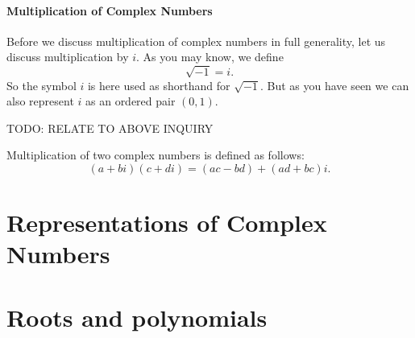 \documentclass[11pt]{article}
\theoremstyle{definition}
\begin{document}
\subsection{Multiplication of Complex Numbers}

Before we discuss multiplication of complex numbers in full generality, let us discuss multiplication by $i$. As you may know, we define
\[ \sqrt{-1} = i. \]
So the symbol $i$ is here used as shorthand for $\sqrt{-1}$. But as you have seen we can also represent $i$ as an ordered pair $(0,1)$.

TODO: RELATE TO ABOVE INQUIRY

Multiplication of two complex numbers is defined as follows:
\[ (a+bi)(c+di) = (ac-bd) + (ad+bc)i.\]

\part{Representations of Complex Numbers}

\part{Roots and polynomials}
\end{document}
